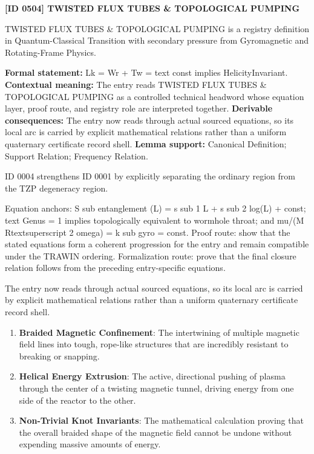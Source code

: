 \clearpage
\noindent\textbf{[ID 0504] TWISTED FLUX TUBES \& TOPOLOGICAL PUMPING}\par
\vspace{0.35em}
\begingroup\small
{}
TWISTED FLUX TUBES \& TOPOLOGICAL PUMPING is a registry definition in Quantum-Classical Transition with secondary pressure from Gyromagnetic and Rotating-Frame Physics.

\begingroup\footnotesize\setlength{\emergencystretch}{3em}\sloppy
\textbf{Formal statement:} Lk = Wr + Tw = text const implies HelicityInvariant. \textbf{Contextual meaning:} The entry reads TWISTED FLUX TUBES \& TOPOLOGICAL PUMPING as a controlled technical headword whose equation layer, proof route, and registry role are interpreted together. \textbf{Derivable consequences:} The entry now reads through actual sourced equations, so its local arc is carried by explicit mathematical relations rather than a uniform quaternary certificate record shell. \textbf{Lemma support:} Canonical Definition; Support Relation; Frequency Relation.\par
\endgroup

ID 0004 strengthens ID 0001 by explicitly separating the ordinary region from the TZP degeneracy region.

Equation anchors: S sub entanglement (L) = s sub 1 L + s sub 2 log(L) + const; text Genus = 1 implies topologically equivalent to wormhole throat; and mu/(M Rtextsuperscript 2 omega) = k sub gyro = const. Proof route: show that the stated equations form a coherent progression for the entry and remain compatible under the TRAWIN ordering. Formalization route: prove that the final closure relation follows from the preceding entry-specific equations.

The entry now reads through actual sourced equations, so its local arc is carried by explicit mathematical relations rather than a uniform quaternary certificate record shell.
\endgroup

\begin{enumerate}[leftmargin=1.6em,itemsep=6pt,topsep=4pt]
\item \textbf{Braided Magnetic Confinement}: The intertwining of multiple magnetic field lines into tough, rope-like structures that are incredibly resistant to breaking or snapping.
\item \textbf{Helical Energy Extrusion}: The active, directional pushing of plasma through the center of a twisting magnetic tunnel, driving energy from one side of the reactor to the other.
\item \textbf{Non-Trivial Knot Invariants}: The mathematical calculation proving that the overall braided shape of the magnetic field cannot be undone without expending massive amounts of energy.
\end{enumerate}

